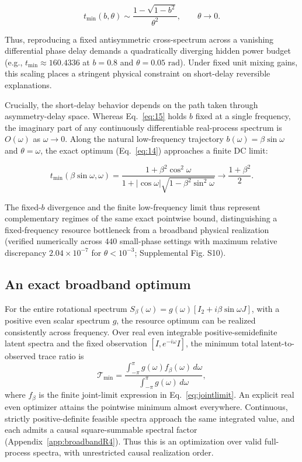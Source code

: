 \documentclass[aps,pre,reprint,amsmath,amssymb,superscriptaddress]{revtex4-2}
\begin{document}
\begin{equation}\label{eq:15}
\boxed{
t_{\min}(b,\theta)
\sim
\frac{
1-\sqrt{1-b^2}
}{
\theta^2
},
\qquad \theta\to0.
}
\end{equation}



Thus, reproducing a fixed antisymmetric cross-spectrum across a vanishing differential phase delay demands a quadratically diverging hidden power budget (e.g., $t_{\min} \approx 160.4336$ at $b = 0.8$ and $\theta = 0.05\text{ rad}$). Under fixed unit mixing gains, this scaling places a stringent physical constraint on short-delay reversible explanations.

Crucially, the short-delay behavior depends on the path taken through asymmetry-delay space. Whereas Eq.~\eqref{eq:15} holds $b$ fixed at a single frequency, the imaginary part of any continuously differentiable real-process spectrum is $O(\omega)$ as $\omega \to 0$. Along the natural low-frequency trajectory $b(\omega) = \beta\sin\omega$ and $\theta = \omega$, the exact optimum (Eq.~\eqref{eq:14}) approaches a finite DC limit:

\begin{equation}\label{eq:jointlimit}
 t_{\min}(\beta\sin\omega,\omega)=
 \frac{1+\beta^2\cos^2\omega}{1+|\cos\omega|\sqrt{1-\beta^2\sin^2\omega}}
 \longrightarrow \frac{1+\beta^2}{2}.
\end{equation}



The fixed-$b$ divergence and the finite low-frequency limit thus represent complementary regimes of the same exact pointwise bound, distinguishing a fixed-frequency resource bottleneck from a broadband physical realization (verified numerically across $440$ small-phase settings with maximum relative discrepancy $2.04 \times 10^{-7}$ for $\theta < 10^{-3}$; Supplemental Fig. S10).

\subsection{An exact broadband optimum}
For the entire rotational spectrum $S_\beta(\omega)=g(\omega)[I_2+i\beta\sin\omega J]$, with a positive even scalar spectrum $g$, the resource optimum can be realized consistently across frequency. Over real even integrable positive-semidefinite latent spectra and the fixed observation $[I,e^{-i\omega}I]$, the minimum total latent-to-observed trace ratio is
\begin{equation}\label{eq:broadmain}
 \mathcal T_{\min}=\frac{\int_{-\pi}^{\pi}g(\omega)f_\beta(\omega)\,d\omega}
 {\int_{-\pi}^{\pi}g(\omega)\,d\omega},
\end{equation}
where $f_\beta$ is the finite joint-limit expression in Eq.~\eqref{eq:jointlimit}. An explicit real even optimizer attains the pointwise minimum almost everywhere. Continuous, strictly positive-definite feasible spectra approach the same integrated value, and each admits a causal square-summable spectral factor (Appendix~\ref{app:broadbandR4}). Thus this is an optimization over valid full-process spectra, with unrestricted causal realization order.
\end{document}
